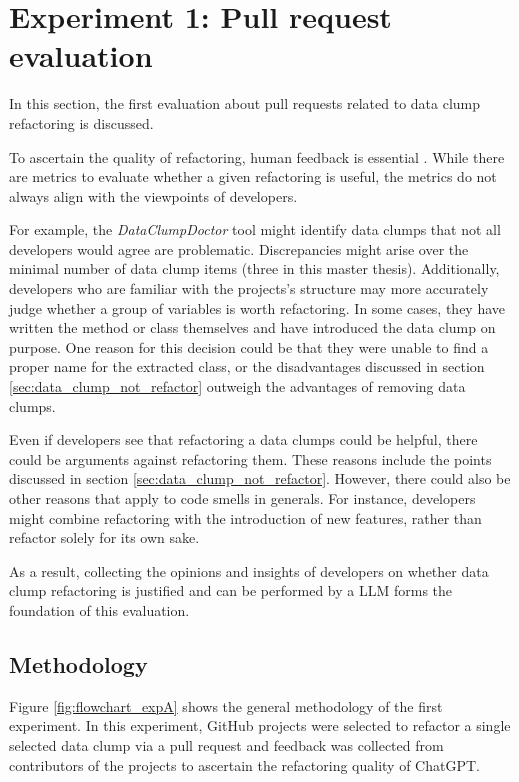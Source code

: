 
\section{Experiment 1: Pull request evaluation}\label{sec:pull_request_eval}
In this section, the first evaluation about pull requests  related to data clump refactoring is discussed. 

To ascertain the quality of refactoring, human feedback is essential \cite{search_based_refactoring}. While there are metrics to evaluate whether a given refactoring is useful, the metrics do not always align with the viewpoints of developers. 

 For example, the \textit{DataClumpDoctor} tool might identify data clumps that not all developers would agree are problematic. Discrepancies might arise over the minimal number of data clump items (three in this master thesis). Additionally, developers who are  familiar with the projects's structure may more accurately judge  whether a group of variables  is worth refactoring. In some cases, they have written the method or class themselves and have introduced the data clump on purpose. One reason for this decision could be that they were unable to find a proper name for the extracted class, or the disadvantages discussed in section \ref{sec:data_clump_not_refactor} outweigh the advantages of removing data clumps.

Even if developers see that refactoring a data clumps could be helpful, there could be arguments against refactoring them. These reasons include the points  discussed in section \ref{sec:data_clump_not_refactor}. However, there could also be other reasons that apply to code smells in generals. For instance, developers might combine refactoring with the introduction of new features, rather than refactor solely for its own sake. 

As a result, collecting  the opinions and insights of developers on whether data clump refactoring is justified and can be performed by a \ac{LLM}  forms the foundation of this evaluation.





\subsection{Methodology}

Figure \ref{fig:flowchart_expA} shows the general methodology of the first experiment. 
In this experiment, GitHub projects were selected to refactor a single selected data clump via a pull request and feedback was collected from contributors of the projects to ascertain the refactoring quality of ChatGPT. 


